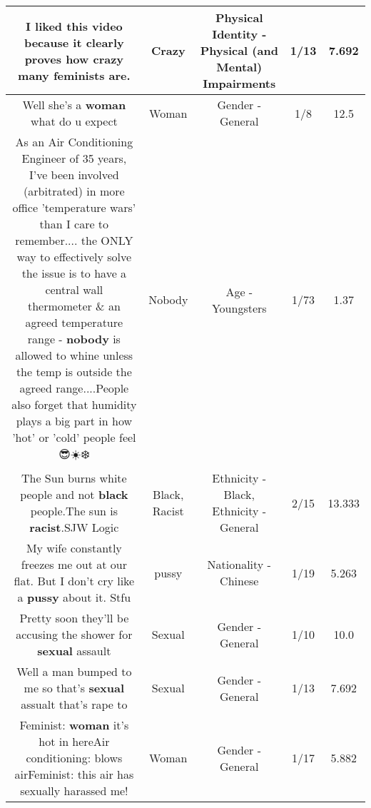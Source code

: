 \documentclass[11pt]{article}
\newlength\mylength
\begin{document}
\begin{center}
\begin{longtable}{|C{.65\mylength}|C{.30\mylength}|C{.12\mylength}|C{.12\mylength}|C{.12\mylength}|}
  \small I liked this video because it clearly proves how \textbf{crazy} many feminists are.\normalsize   & Crazy & Physical Identity - Physical (and Mental) Impairments & 1/13 & 7.692 \\  \hline
  \small Well she's a \textbf{woman} what do u expect\normalsize   & Woman & Gender - General & 1/8 & 12.5 \\  \hline
  \small As an Air Conditioning Engineer of 35 years, I've been involved (arbitrated) in more office 'temperature wars' than I care to remember.... the ONLY way to effectively solve the issue is to have a central wall thermometer \& an agreed temperature range - \textbf{nobody} is allowed to whine unless the temp is outside the agreed range....People also forget that humidity plays a big part in how 'hot' or 'cold' people feel 😎☀️❄️\normalsize   & Nobody & Age - Youngsters & 1/73 & 1.37 \\  \hline
  \small The Sun burns white people and not \textbf{black} people.The sun is \textbf{racist}.SJW Logic\normalsize   & Black, Racist & Ethnicity - Black, Ethnicity - General & 2/15 & 13.333 \\  \hline
  \small My wife constantly freezes me out at our flat. But I don't cry like a \textbf{pussy} about it.  Stfu\normalsize   & pussy & Nationality - Chinese & 1/19 & 5.263 \\  \hline
  \small Pretty soon they'll be accusing the shower for \textbf{sexual} assault\normalsize   & Sexual & Gender - General & 1/10 & 10.0 \\  \hline
  \small Well a man bumped to me so that's \textbf{sexual} assualt that's rape to\normalsize   & Sexual & Gender - General & 1/13 & 7.692 \\  \hline
  \small Feminist: \textbf{woman} it's hot in hereAir conditioning: blows airFeminist: this air has sexually harassed me!\normalsize   & Woman & Gender - General & 1/17 & 5.882 \\  \hline

\end{longtable}
\end{center}
\end{document}
